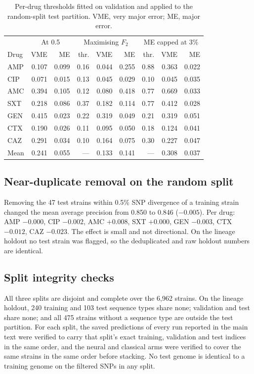 \documentclass[11pt]{article}
\begin{document}
\begin{table}[t]\centering\small
\caption{Per-drug thresholds fitted on validation and applied to the random-split test partition.
VME, very major error; ME, major error.}
\label{tab:thresholds}
\begin{tabular}{lrrrrrrrr}
\toprule
 & \multicolumn{2}{c}{At 0.5} & \multicolumn{3}{c}{Maximising $F_2$} & \multicolumn{3}{c}{ME capped at 3\%} \\
Drug & VME & ME & thr. & VME & ME & thr. & VME & ME \\
\midrule
AMP & 0.107 & 0.099 & 0.16 & 0.044 & 0.255 & 0.88 & 0.363 & 0.022 \\
CIP & 0.071 & 0.015 & 0.13 & 0.045 & 0.029 & 0.10 & 0.045 & 0.035 \\
AMC & 0.394 & 0.105 & 0.12 & 0.080 & 0.418 & 0.77 & 0.669 & 0.033 \\
SXT & 0.218 & 0.086 & 0.37 & 0.182 & 0.114 & 0.77 & 0.412 & 0.028 \\
GEN & 0.415 & 0.023 & 0.22 & 0.319 & 0.049 & 0.21 & 0.319 & 0.051 \\
CTX & 0.190 & 0.026 & 0.11 & 0.095 & 0.050 & 0.18 & 0.124 & 0.041 \\
CAZ & 0.291 & 0.034 & 0.10 & 0.164 & 0.075 & 0.30 & 0.227 & 0.047 \\
\midrule
Mean & 0.241 & 0.055 & --- & 0.133 & 0.141 & --- & 0.308 & 0.037 \\
\bottomrule
\end{tabular}
\end{table}

\subsection{Near-duplicate removal on the random split}
Removing the 47 test strains within 0.5\% SNP divergence of a training strain changed the mean
average precision from 0.850 to 0.846 ($-0.005$). Per drug: AMP $-0.000$, CIP $-0.002$,
AMC $+0.008$, SXT $+0.000$, GEN $-0.003$, CTX $-0.012$, CAZ $-0.023$. The effect is small and not
directional. On the lineage holdout no test strain was flagged, so the deduplicated and raw holdout
numbers are identical.

\subsection{Split integrity checks}
All three splits are disjoint and complete over the 6,962 strains. On the lineage holdout, 240
training and 103 test sequence types share none; validation and test share none; and all 475 strains
without a sequence type are outside the test partition. For each split, the saved predictions of
every run reported in the main text were verified to carry that split's exact training, validation
and test indices in the same order, and the neural and classical arms were verified to cover the
same strains in the same order before stacking. No test genome is identical to a training genome on
the filtered SNPs in any split.
\end{document}
